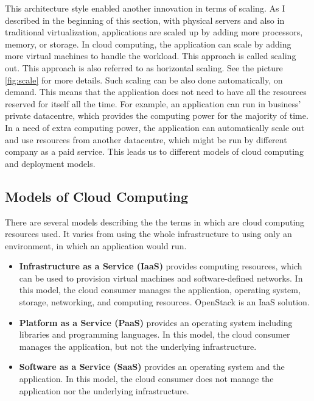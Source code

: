 This architecture style enabled another innovation in terms of scaling. As I described in the beginning of this section, with physical servers and also in traditional virtualization, applications are scaled up by adding more processors, memory, or storage. In cloud computing, the application can scale by adding more virtual machines to handle the workload. This approach is called scaling out. This approach is also referred to as horizontal scaling. See the picture \ref{fig:scale} for more details. Such scaling can be also done automatically, on demand. This means that the application does not need to have all the resources reserved for itself all the time. For example, an application can run in business’ private datacentre, which provides the computing power for the majority of time. In a need of extra computing power, the application can automatically scale out and use resources from another datacentre, which might be run by different company as a paid service. This leads us to different models of cloud computing and deployment models.

\subsection{Models of Cloud Computing}
There are several models \cite{CL210} describing the the terms in which are cloud computing resources used. It varies from using the whole infrastructure to using only an environment, in which an application would run.
\begin{itemize}
  \item{\textbf{Infrastructure as a Service (IaaS)} provides computing resources, which can be used to provision virtual machines and software-defined networks. In this model, the cloud consumer manages the application, operating system, storage, networking, and computing resources. OpenStack is an IaaS solution.}
  \item{\textbf{Platform as a Service (PaaS)} provides an operating system including libraries and programming languages. In this model, the cloud consumer manages the application, but not the underlying infrastructure.}
  \item{\textbf{Software as a Service (SaaS)} provides an operating system and the application. In this model, the cloud consumer does not manage the application nor the underlying infrastructure.}
\end{itemize}


